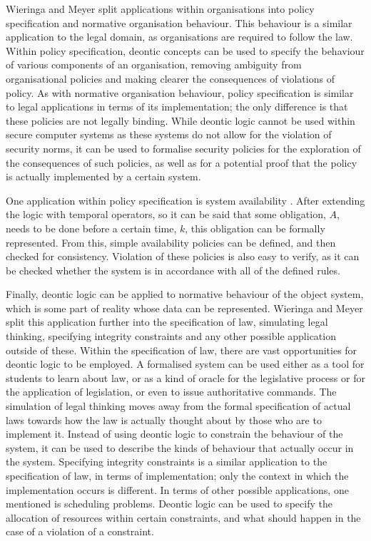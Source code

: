 \documentclass{l4proj}
\begin{document}
Wieringa and Meyer split applications within organisations into policy specification and normative organisation behaviour. This behaviour is a similar application to the legal domain, as organisations are required to follow the law. Within policy specification, deontic concepts can be used to specify the behaviour of various components of an organisation, removing ambiguity from organisational policies and making clearer the consequences of violations of policy. As with normative organisation behaviour, policy specification is similar to legal applications in terms of its implementation; the only difference is that these policies are not legally binding. While deontic logic cannot be used within secure computer systems as these systems do not allow for the violation of security norms, it can be used to formalise security policies for the exploration of the consequences of such policies, as well as for a potential proof that the policy is actually implemented by a certain system. 

One application within policy specification is system availability \cite{brunel04deontic}. After extending the logic with temporal operators, so it can be said that some obligation, $A$, needs to be done before a certain time, $k$, this obligation can be formally represented. From this, simple availability policies can be defined, and then checked for consistency. Violation of these policies is also easy to verify, as it can be checked whether the system is in accordance with all of the defined rules. 

Finally, deontic logic can be applied to normative behaviour of the object system, which is some part of reality whose data can be represented. Wieringa and Meyer split this application further into the specification of law, simulating legal thinking, specifying integrity constraints and any other possible application outside of these. Within the specification of law, there are vast opportunities for deontic logic to be employed. A formalised system can be used either as a tool for students to learn about law, or as a kind of oracle for the legislative process or for the application of legislation, or even to issue authoritative commands. The simulation of legal thinking moves away from the formal specification of actual laws towards how the law is actually thought about by those who are to implement it. Instead of using deontic logic to constrain the behaviour of the system, it can be used to describe the kinds of behaviour that actually occur in the system. Specifying integrity constraints is a similar application to the specification of law, in terms of implementation; only the context in which the implementation occurs is different. In terms of other possible applications, one mentioned is scheduling problems. Deontic logic can be used to specify the allocation of resources within certain constraints, and what should happen in the case of a violation of a constraint. 
\end{document}

